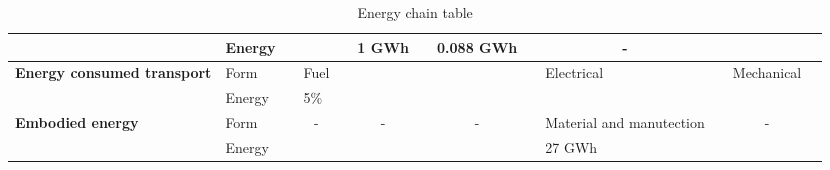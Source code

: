 \begin{table}[]
{\begin{tabular}{|lllllllllllll|}
                                        & Energy                                & \multicolumn{1}{l|}{}            & \multicolumn{1}{l|}{}                  & \multicolumn{1}{l|}{}                & \multicolumn{1}{l|}{1 GWh}        & \multicolumn{1}{l|}{}                & \multicolumn{1}{l|}{0.088 GWh}    & \multicolumn{1}{l|}{}                & \multicolumn{1}{c|}{-}                        & \multicolumn{1}{l|}{}                  & \multicolumn{1}{l|}{}                      &                  \\ \hline
\textbf{Energy consumed transport}      & Form                                  & \multicolumn{1}{l|}{}            & \multicolumn{1}{l|}{Fuel}              & \multicolumn{1}{l|}{}                & \multicolumn{1}{l|}{}             & \multicolumn{1}{l|}{}                & \multicolumn{1}{l|}{}             & \multicolumn{1}{l|}{}                & \multicolumn{1}{l|}{Electrical}               & \multicolumn{1}{l|}{}                  & \multicolumn{1}{l|}{Mechanical}            &                  \\ \hline
                                        & Energy                                & \multicolumn{1}{l|}{}            & \multicolumn{1}{l|}{5\%}               & \multicolumn{1}{l|}{}                & \multicolumn{1}{l|}{}             & \multicolumn{1}{l|}{}                & \multicolumn{1}{l|}{}             & \multicolumn{1}{l|}{}                & \multicolumn{1}{l|}{}                         & \multicolumn{1}{l|}{}                  & \multicolumn{1}{l|}{}                      &                  \\ \hline
\textbf{Embodied energy}                & Form                                  & \multicolumn{1}{l|}{}            & \multicolumn{1}{c|}{-}                 & \multicolumn{1}{l|}{}                & \multicolumn{1}{c|}{-}            & \multicolumn{1}{l|}{}                & \multicolumn{1}{c|}{-}            & \multicolumn{1}{l|}{}                & \multicolumn{1}{l|}{Material and manutection} & \multicolumn{1}{l|}{}                  & \multicolumn{1}{c|}{-}                     &                  \\ \hline
                                        & Energy                                & \multicolumn{1}{l|}{}            & \multicolumn{1}{l|}{}                  & \multicolumn{1}{l|}{}                & \multicolumn{1}{l|}{}             & \multicolumn{1}{l|}{}                & \multicolumn{1}{l|}{}             & \multicolumn{1}{l|}{}                & \multicolumn{1}{l|}{27 GWh}                   & \multicolumn{1}{l|}{}                  & \multicolumn{1}{l|}{}                      &                  \\ \hline
\end{tabular}%
}
\caption{Energy chain table}
\label{tab:my-table}
\end{table}